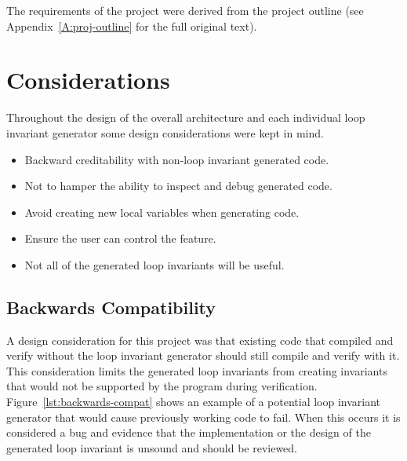 The requirements of the project were derived from the project outline (see
Appendix~\ref{A:proj-outline} for the full original text).


\section{Considerations}

Throughout the design of the overall architecture and each individual loop invariant
generator some design considerations were kept in mind.
\begin{itemize}
    \item{Backward creditability with non-loop invariant generated code.}
    \item{Not to hamper the ability to inspect and debug generated code.}
    \item{Avoid creating new local variables when generating code.}
    \item{Ensure the user can control the feature.}
    \item{Not all of the generated loop invariants will be useful.}
\end{itemize}

\subsection{Backwards Compatibility}

A design consideration for this project was that existing code that compiled
and verify without the loop invariant generator should still compile and verify
with it.
This consideration limits the generated loop invariants from creating
invariants that would not be supported by the program during verification.
Figure~\ref{lst:backwards-compat} shows an example of a potential loop
invariant generator that would cause previously working code to fail.
When this occurs it is considered a bug and evidence that the implementation or
the design of the generated loop invariant is unsound and should be reviewed.

